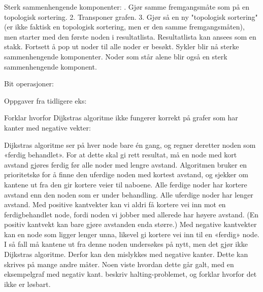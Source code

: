 \documentclass[10pt,a4paper]{article}
\begin{document}
\begin{multicols}{4}
{\color{red}Sterk sammenhengende komponenter:\color{black}
. Gjør samme fremgangsmåte som på en topologisk sortering.
2. Transponer grafen.
3. Gjør så en ny "topologisk sortering" (er ikke faktisk en topologisk sortering, men er den samme fremgangsmåten), men starter med den første noden i resultatlista. Resultatlista kan ansees som en stakk. Fortsett å pop ut noder til alle noder er besøkt. Sykler blir nå sterke sammenhengende komponenter. Noder som står alene blir også en sterk sammenhengende komponent.

\noindent
\color{red}Bit operasjoner: \color{black}
\noindent
\begin{table}[H]
\end{table}


\noindent
\color{red}Oppgaver fra tidligere eks:\color{black}

\newline
\color{orange}Forklar hvorfor Dijkstras algoritme ikke fungerer korrekt på grafer som har kanter med
negative vekter:\color{black}

Dijkstras algoritme ser på hver node bare én gang, og regner deretter noden som «ferdig behandlet».
For at dette skal gi rett resultat, må en node med kort avstand gjøres ferdig før alle noder med
lengre avstand. Algoritmen bruker en prioritetskø for å finne den uferdige noden med kortest
avstand, og sjekker om kantene ut fra den gir kortere veier til naboene. Alle ferdige noder har
kortere avstand enn den noden som er under behandling. Alle uferdige noder har lenger avstand. Med positive kantvekter kan vi aldri få kortere vei inn mot en ferdigbehandlet node, fordi noden
vi jobber med allerede har høyere avstand. (En positiv kantvekt kan bare gjøre avstanden enda
større.)
Med negative kantvekter kan en node som ligger lenger unna, likevel gi kortere vei inn til en
«ferdig» node. I så fall må kantene ut fra denne noden undersøkes på nytt, men det gjør ikke
Dijkstras algoritme. Derfor kan den mislykkes med negative kanter.
Dette kan skrives på mange andre måter. Noen viste hvordan dette går galt, med en eksempelgraf
med negativ kant.
\newline
\color{orange}beskriv halting-problemet, og forklar hvorfor det ikke er løsbart.\color{black}

}
\end{multicols}
\end{document}
